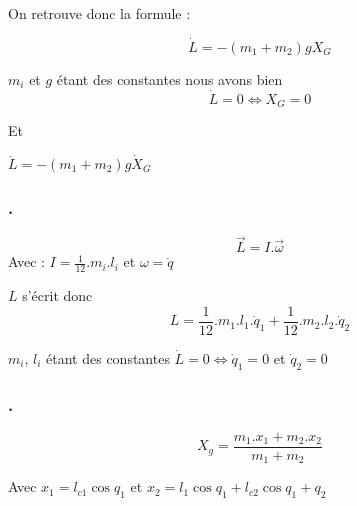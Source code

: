 \documentclass[a4paper,12pt]{report}
\begin{document}
On retrouve donc la formule :

$$\dot{L} = - (m_1 + m_2)g X_G$$

$m_i$ et $g$ étant des constantes nous avons bien
$$\dot{L} = 0 \Leftrightarrow X_G = 0$$

Et

$\ddot{L} = - (m_1 + m_2)g \dot{X}_G$



\subsubsection{.}
\label{subs:}

$$\overrightarrow{L} = I.\overrightarrow{\omega}$$
Avec : $I = \frac{1}{12}.m_i.l_i$ et $\omega = \dot{q}$

$L$ s'écrit donc
$$L = \frac{1}{12}.m_1.l_1.\dot{q}_1 + \frac{1}{12}.m_2.l_2.\dot{q}_2$$

$m_i$, $l_i$ étant des constantes $\dot{L} = 0 \Leftrightarrow \dot{q}_1 = 0$ et $\dot{q}_2 = 0$


\subsubsection{.}
\label{subs:}

$$X_g = \frac{m_1.x_1 + m_2.x_2}{m_1 + m_2}$$

Avec $x_1 = l_{c1} \cos{q_1}$ et $x_2 = l_{1} \cos{q_1} + l_{c2} \cos{q_1 + q_2}$
\end{document}
